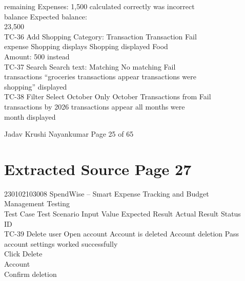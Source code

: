 \documentclass[12pt,a4paper]{report}
\begin{document}
remaining       Expenses: 1,500     calculated correctly was incorrect\\ 
balance         Expected balance:\\ 
23,500\\ 
TC-36     Add Shopping Category:              Transaction         Transaction           Fail\\ 
expense         Shopping            displays Shopping   displayed Food\\ 
Amount: 500                             instead\\ 
TC-37     Search          Search text:        Matching            No matching           Fail\\ 
transactions    “groceries          transactions appear transactions were\\ 
shopping”                               displayed\\ 
TC-38     Filter          Select October      Only October        Transactions from     Fail\\ 
transactions by 2026                transactions appear all months were\\ 
month                                                   displayed\\ 

\smallskip

\smallskip

\smallskip

\smallskip
Jadav Krushi Nayankumar                                                          Page 25 of 65\\ 

\clearpage
\section*{Extracted Source Page 27}
230102103008                           SpendWise – Smart Expense Tracking and Budget\\ 
Management Testing\\ 

\smallskip
Test Case Test Scenario Input Value            Expected Result Actual Result                 Status\\ 
ID\\ 
TC-39       Delete user     Open account       Account is deleted Account deletion           Pass\\ 
account         settings                                   worked successfully\\ 
Click Delete\\ 
Account\\ 
Confirm deletion\\ 
\end{document}
